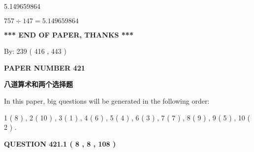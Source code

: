 \documentclass{ctexart}
\begin{document}
  
 
 
\noindent{}

5.149659864
 
 
 
 
\noindent{}

$ %
757 \div  %
147=   %
5.149659864$
 
 
   
   
 \vspace{0.2in}
 
   
   
   
   
\vspace{1.0in} 
{\textbf{\large{ *** END OF PAPER, THANKS *** }}} 
   
   
\hspace{1.0in} By: 
 239 ( 416 ,  443 )
   
   
   
   
\newpage 
\setcounter{page}{ 
   421001 } 
   
   
   
   
 {\textbf{ \Large{ PAPER NUMBER  421  }}}
   
   
\vspace{0.2in}
   
   
   
   
   
   
 \vspace{0.2in}
{\LARGE {\textbf{ 八道算术和两个选择题}}}
   
   
   
\vspace{0.2in}
   
In this paper, big questions will be generated in the following order: 
   
   
   1 ( 8 )
 ,
   2 ( 10 )
 ,
   3 ( 1 )
 ,
   4 ( 6 )
 ,
   5 ( 4 )
 ,
   6 ( 3 )
 ,
   7 ( 7 )
 ,
   8 ( 9 )
 ,
   9 ( 5 )
 ,
   10 ( 2 )
 .
  
\vspace{0.2in}
  
{\textbf{\Large{QUESTION
421.1 
 ( 8 , 8 , 108 )
}}}
  
  
 
 
\noindent{}
\end{document}
